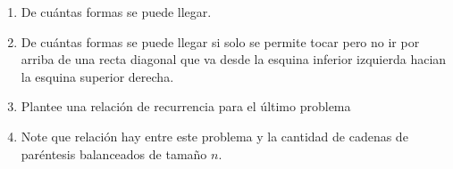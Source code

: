 \documentclass{article}
\begin{document}
\begin{enumerate}
        \begin{enumerate}
            \item De cu\'antas formas se puede llegar.
            \item De cu\'antas formas se puede llegar si solo se permite tocar pero no ir por arriba de una recta diagonal que va desde la esquina inferior izquierda hacian la esquina superior derecha. 
            \item Plantee una relaci\'on de recurrencia para el \'ultimo problema
            \item Note que relaci\'on hay entre este problema y la cantidad de cadenas de par\'entesis balanceados de tamaño $n$.
        \end{enumerate}
\end{enumerate}
\end{document}
